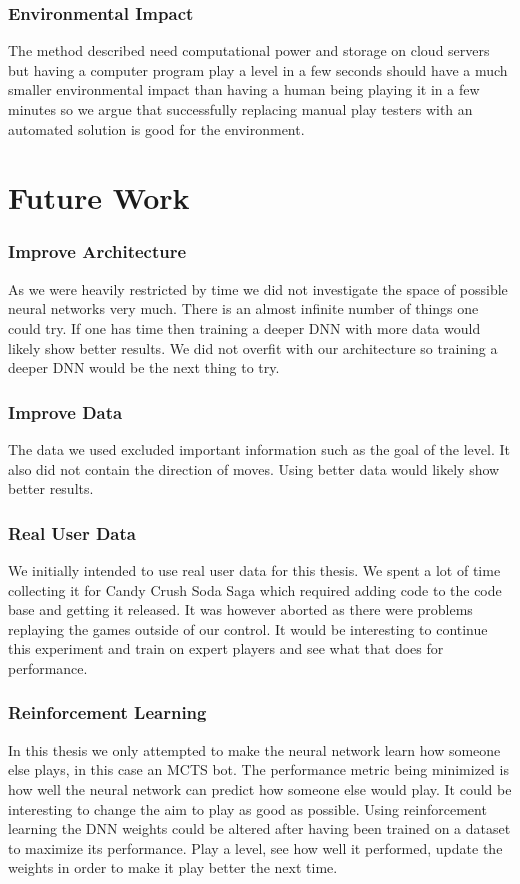 \documentclass{kththesis}
\begin{document}
\subsubsection{Environmental Impact}
The method described need computational power and storage on cloud servers but having a computer program play a level in a few seconds should have a much smaller environmental impact than having a human being playing it in a few minutes so we argue that successfully replacing manual play testers with an automated solution is good for the environment.


\section{Future Work}
\subsubsection{Improve Architecture}
As we were heavily restricted by time  we did not investigate the space of possible neural networks very much. There is an almost infinite number of things one could try. If one has time then training a deeper DNN with more data would likely show better results. We did not overfit with our architecture so training a deeper DNN would be the next thing to try.

\subsubsection{Improve Data}
The data we used excluded important information such as the goal of the level. It also did not contain the direction of moves. Using better data would likely show better results.

\subsubsection{Real User Data}
We initially intended to use real user data for this thesis. We spent a lot of time collecting  it for Candy Crush Soda Saga which required adding code to the code base and getting it released.  It was however aborted as there were problems replaying the games outside of our control. It would be interesting to continue this experiment and train on expert players and see what that does for performance.

\subsubsection{Reinforcement Learning}
In this thesis we only attempted to make the neural network learn how someone else plays, in this case an MCTS bot. The performance metric being minimized is how well the neural network can predict how someone else would play. It could be interesting to change the aim to play as good as possible. Using reinforcement learning the DNN weights could be altered after having been trained on a dataset to maximize its performance. Play a level, see how well it performed, update the weights in order to make it play better the next time. 
\end{document}
